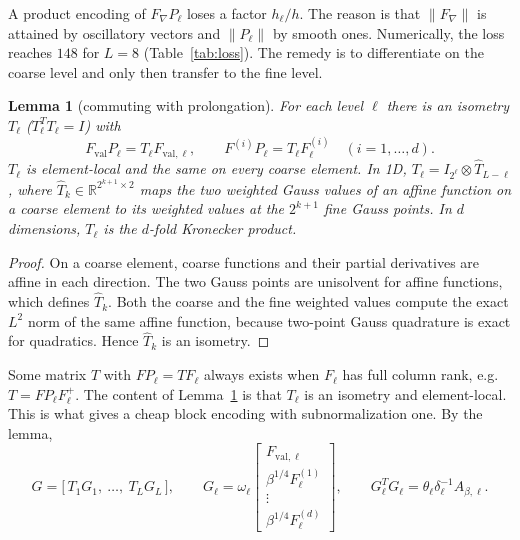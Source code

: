 \documentclass[11pt,a4paper]{article}
\newcommand{\R}{\mathbb{R}}
\newtheorem{lemma}[theorem]{Lemma}
\theoremstyle{remark}
\begin{document}
A product encoding of $F_\nabla P_\ell$ loses a factor $h_\ell/h$. The reason is
that $\|F_\nabla\|$ is attained by oscillatory vectors and $\|P_\ell\|$ by smooth
ones. Numerically, the loss reaches $148$ for $L=8$ (Table~\ref{tab:loss}).
The remedy is to differentiate on the coarse level and only then transfer
to the fine level.

\begin{lemma}[commuting with prolongation]\label{lem:commute}
For each level $\ell$ there is an isometry $T_\ell$ ($T_\ell^TT_\ell=I$) with
\[
F_{\mathrm{val}}P_\ell=T_\ell F_{\mathrm{val},\ell},\qquad F^{(i)}P_\ell=T_\ell F^{(i)}_\ell\quad(i=1,\dots,d).
\]
$T_\ell$ is element-local and the same on every coarse element. In 1D,
$T_\ell=I_{2^\ell}\otimes\widehat T_{L-\ell}$, where $\widehat T_k\in\R^{2^{k+1}\times2}$ maps the two
weighted Gauss values of an affine function on a coarse element to its
weighted values at the $2^{k+1}$ fine Gauss points. In $d$ dimensions,
$T_\ell$ is the $d$-fold Kronecker product.
\end{lemma}
\begin{proof}
On a coarse element, coarse functions and their partial derivatives are
affine in each direction. The two Gauss points are unisolvent for affine
functions, which defines $\widehat T_k$. Both the coarse and the fine weighted
values compute the exact $L^2$ norm of the same affine function, because
two-point Gauss quadrature is exact for quadratics. Hence $\widehat T_k$ is an
isometry.
\end{proof}

Some matrix $T$ with $F P_\ell=TF_\ell$ always exists when $F_\ell$ has full column
rank, e.g. $T=FP_\ell F_\ell^+$. The content of Lemma~\ref{lem:commute} is that
$T_\ell$ is an isometry and element-local. This is what gives a cheap block
encoding with subnormalization one. By the lemma,
\begin{equation}\label{eq:Gsum}
G=\big[\,T_1G_1,\ \dots,\ T_LG_L\,\big],\qquad
G_\ell=\omega_\ell\begin{bmatrix}F_{\mathrm{val},\ell}\\ \beta^{1/4}F^{(1)}_\ell\\ \vdots\\ \beta^{1/4}F^{(d)}_\ell\end{bmatrix},\qquad
G_\ell^TG_\ell=\theta_\ell\delta_\ell^{-1}A_{\beta,\ell} .
\end{equation}
\end{document}

